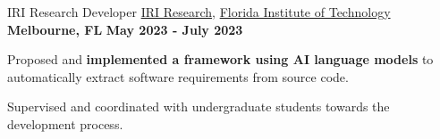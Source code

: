 \begin{cventries}
\cventry
{IRI Research Developer}
{\href{https://www.fit.edu/faculty-profiles/s/slhoub-khaled-/}{IRI Research},  \href{https://www.fit.edu}{Florida Institute of Technology}}
{\textbf{Melbourne, FL}}
{\textbf{May 2023 - July 2023}}
{
\begin{cvitems}
\item Proposed and \textbf{implemented a framework using AI language models} to automatically extract software requirements from source code.
\item Supervised and coordinated with undergraduate students towards the development process.
\end{cvitems}
}



\end{cventries}
